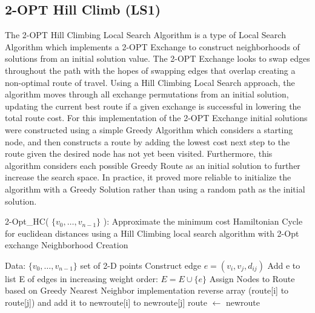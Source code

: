 \documentclass[format=sigconf]{acmart}
\begin{document}
\subsection{ 2-OPT Hill Climb (LS1)}
The 2-OPT Hill Climbing Local Search Algorithm is a type of Local Search Algorithm which implements a 2-OPT Exchange to construct neighborhoods of solutions from an initial solution value.
The 2-OPT Exchange looks to swap edges throughout the path with the hopes of swapping edges that overlap creating a non-optimal route of travel. Using a Hill Climbing Local Search approach, the 
algorithm moves through all exchange permutations from an initial solution, updating the current best route if a given exchange is successful in lowering the total route cost. For this implementation of 
the 2-OPT Exchange initial solutions were constructed using a simple Greedy Algorithm which considers a starting node, and then constructs a route by adding the lowest cost next step to the route given 
the desired node has not yet been visited. Furthermore, this algorithm considers each possible Greedy Route as an initial solution to further increase the search space. In practice, it proved more reliable to 
initialize the algorithm with a Greedy Solution rather than using a random path as the initial solution.
\begin{algorithm}[H] 
	\caption{  2-Opt\_HC( $\{v_0, \hdots, v_{n-1}\}$ ): Approximate the minimum cost Hamiltonian Cycle for euclidean distances using a Hill Climbing local search algorithm with 2-Opt exchange Neighborhood Creation}
	\begin{algorithmic} 
		\STATE Data: $\{v_0, \hdots, v_{n-1}\}$ set of 2-D points
			\STATE Construct edge $e = (v_i, v_j, d_{ij})$
			\STATE Add e to list E of edges in increasing weight order: $E = E \cup \{e\}$
		\ENDFOR
			\STATE Assign Nodes to Route based on Greedy Nearest Neighbor implementation
		\ENDWHILE
				\STATE reverse array (route[i] to route[j]) and add it to newroute[i] to newroute[j]
					\STATE route $\leftarrow$ newroute
				\ENDIF
			\ENDFOR
		\ENDFOR

	\end{algorithmic}
\end{algorithm}
\end{document}
